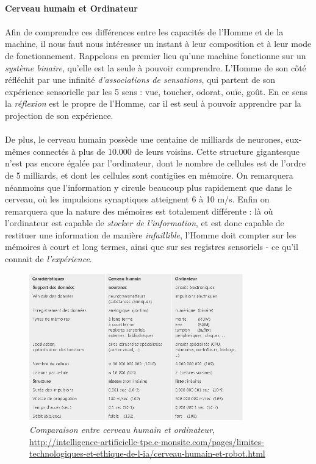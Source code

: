 \paragraph{Cerveau humain et Ordinateur}

\paragraph{} Afin de comprendre ces différences entre les capacités de l'Homme et de la machine, il nous faut nous
intéresser un instant à leur composition et à leur mode de fonctionnement. Rappelons en premier lieu qu'une machine
fonctionne sur un \emph{système binaire}, qu'elle est la seule à pouvoir comprendre. L'Homme de son côté réfléchit
par une infinité \emph{d'associations de sensations}, qui partent de son expérience sensorielle par les 5 sens : vue,
toucher, odorat, ouïe, goût. En ce sens la \emph{réflexion} est le propre de l'Homme, car il est seul à pouvoir 
apprendre par la projection de son expérience. \cite{Internet5}

\paragraph{} De plus, le cerveau humain possède une centaine de milliards de neurones, eux-mêmes connectés à plus de 10.000
de leurs voisins. Cette structure gigantesque n'est pas encore égalée par l'ordinateur, dont le nombre de cellules est de
l'ordre de 5 milliards, et dont les cellules sont contigües en mémoire. On remarquera néanmoins que l'information y circule
beaucoup plus rapidement que dans le cerveau, où les impulsions synaptiques atteignent 6 à 10 m/s. Enfin on remarquera que la
nature des mémoires est totalement différente : là où l'ordinateur est capable de \emph{stocker de l'information}, et est donc
capable de restituer une information de manière \emph{infaillible}, l'Homme doit compter sur les mémoires à court et long termes,
ainsi que sur ses registres sensoriels - ce qu'il connait de \emph{l'expérience}. \cite{Internet4}

\begin{figure}[h]
    \centering
    \includegraphics[width=350px]{chapters/03/images/cerveau-robot.jpg}
    \caption{\label{comparatif} \emph{Comparaison entre cerveau humain et ordinateur}, \url{http://intelligence-artificielle-tpe.e-monsite.com/pages/limites-technologiques-et-ethique-de-l-ia/cerveau-humain-et-robot.html}}
\end{figure}

